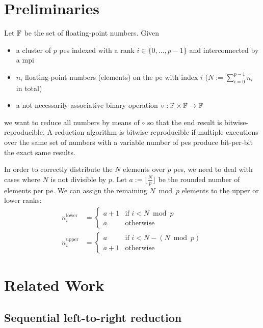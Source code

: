 \section{Preliminaries}
\label{sec:Preliminaries}
Let $\mathbb{F}$ be the set of floating-point numbers. Given
\begin{itemize}
\item a cluster of $p$ \glspl{pe} indexed with a rank $i \in \{0, \ldots, p - 1\}$ and interconnected by a \gls{mpi}
\item $n_i$ floating-point numbers (elements) on the \gls{pe} with index $i$ ($N := \sum_{i=0}^{p-1} n_i$ in total)
\item a not necessarily associative binary operation $\circ: \mathbb{F} \times \mathbb{F} \rightarrow \mathbb{F}$
\end{itemize}
we want to reduce all numbers by means of $\circ$ so that the end result is bitwise-reproducible.
A reduction algorithm is bitwise-reproducible if multiple executions over the same set of numbers with a variable number of \glspl{pe} produce bit-per-bit the exact same results.

In order to correctly distribute the $N$ elements over $p$ \glspl{pe}, we need to deal with cases where $N$ is not divisible by $p$.
Let $a := \lfloor \tfrac{N}{p} \rfloor$ be the rounded number of elements per \gls{pe}.
We can assign the remaining $N \bmod p$ elements to the upper or lower ranks:
\begin{align}
\label{eq:lowerDistribution}
n_i^{\textrm{lower}} &= \begin{cases}
    a + 1 & \textrm{if } i < N \bmod p \\
    a & \textrm{otherwise}
\end{cases} \\
\label{eq:upperDistribution}
n_i^{\textrm{upper}} &= \begin{cases}
    a & \textrm{if } i < N - (N \bmod p) \\
    a + 1 & \textrm{otherwise}
\end{cases}
\end{align}

\section{Related Work}
\label{sec:RelatedWork}

\subsection{Sequential left-to-right reduction}
\label{sec:SequentialLeftToRightReduction}


